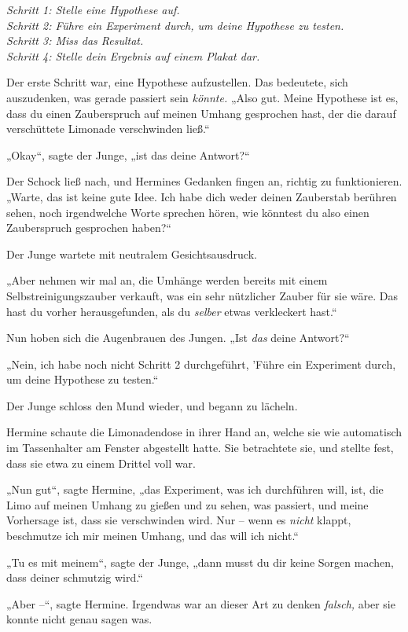 \emph{Schritt 1: Stelle eine Hypothese auf.\\
Schritt 2: Führe ein Experiment durch, um deine Hypothese zu testen.\\
Schritt 3: Miss das Resultat.\\
Schritt 4: Stelle dein Ergebnis auf einem Plakat dar.}

Der erste Schritt war, eine Hypothese aufzustellen. Das bedeutete, sich auszudenken, was gerade passiert sein \emph{könnte.} „Also gut. Meine Hypothese ist es, dass du einen Zauberspruch auf meinen Umhang gesprochen hast, der die darauf verschüttete Limonade verschwinden ließ.“ 

„Okay“, sagte der Junge, „ist das deine Antwort?“ 

Der Schock ließ nach, und Hermines Gedanken fingen an, richtig zu funktionieren. „Warte, das ist keine gute Idee. Ich habe dich weder deinen Zauberstab berühren sehen, noch irgendwelche Worte sprechen hören, wie könntest du also einen Zauberspruch gesprochen haben?“ 

Der Junge wartete mit neutralem Gesichtsausdruck. 

„Aber nehmen wir mal an, die Umhänge werden bereits mit einem Selbstreinigungszauber verkauft, was ein sehr nützlicher Zauber für sie wäre. Das hast du vorher herausgefunden, als du \emph{selber} etwas verkleckert hast.“ 

Nun hoben sich die Augenbrauen des Jungen. „Ist \emph{das} deine Antwort?“ 

„Nein, ich habe noch nicht Schritt 2 durchgeführt, 'Führe ein Experiment durch, um deine Hypothese zu testen.“ 

Der Junge schloss den Mund wieder, und begann zu lächeln. 

Hermine schaute die Limonadendose in ihrer Hand an, welche sie wie automatisch im Tassenhalter am Fenster abgestellt hatte. Sie betrachtete sie, und stellte fest, dass sie etwa zu einem Drittel voll war. 

„Nun gut“, sagte Hermine, „das Experiment, was ich durchführen will, ist, die Limo auf meinen Umhang zu gießen und zu sehen, was passiert, und meine Vorhersage ist, dass sie verschwinden wird. Nur – wenn es \emph{nicht} klappt, beschmutze ich mir meinen Umhang, und das will ich nicht.“ 

„Tu es mit meinem“, sagte der Junge, „dann musst du dir keine Sorgen machen, dass deiner schmutzig wird.“ 

„Aber –“, sagte Hermine. Irgendwas war an dieser Art zu denken \emph{falsch,} aber sie konnte nicht genau sagen was. 

